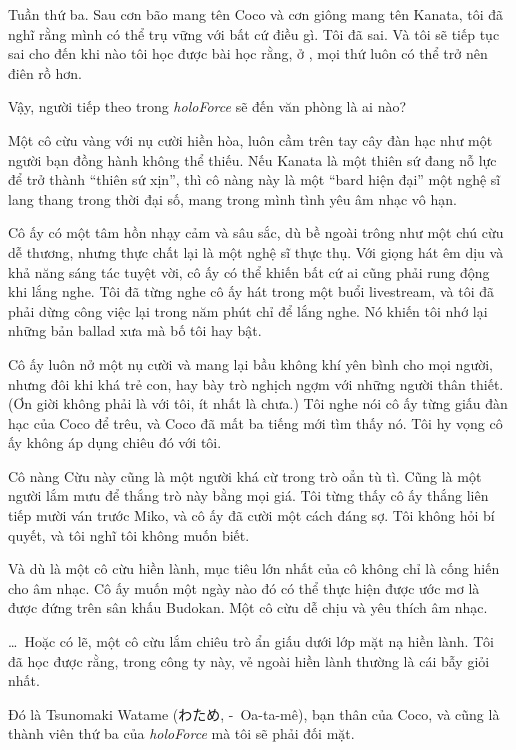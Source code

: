 \documentclass[../main.tex]{subfiles}
\begin{document}

Tuần thứ ba. Sau cơn bão mang tên Coco và cơn giông mang tên Kanata, tôi đã nghĩ rằng mình có thể trụ vững với bất cứ điều gì. Tôi đã sai. Và tôi sẽ tiếp tục sai cho đến khi nào tôi học được bài học rằng, ở \hll, mọi thứ luôn có thể trở nên điên rồ hơn.

Vậy, người tiếp theo trong \textit{holoForce} sẽ đến văn phòng là ai nào?

Một cô cừu vàng với nụ cười hiền hòa, luôn cầm trên tay cây đàn hạc như một người bạn đồng hành không thể thiếu. Nếu Kanata là một thiên sứ đang nỗ lực để trở thành ``thiên sứ xịn'', thì cô nàng này là một ``bard hiện đại'' một nghệ sĩ lang thang trong thời đại số, mang trong mình tình yêu âm nhạc vô hạn.

Cô ấy có một tâm hồn nhạy cảm và sâu sắc, dù bề ngoài trông như một chú cừu dễ thương, nhưng thực chất lại là một nghệ sĩ thực thụ. Với giọng hát êm dịu và khả năng sáng tác tuyệt vời, cô ấy có thể khiến bất cứ ai cũng phải rung động khi lắng nghe. Tôi đã từng nghe cô ấy hát trong một buổi livestream, và tôi đã phải dừng công việc lại trong năm phút chỉ để lắng nghe. Nó khiến tôi nhớ lại những bản ballad xưa mà bố tôi hay bật.

Cô ấy luôn nở một nụ cười và mang lại bầu không khí yên bình cho mọi người, nhưng đôi khi khá trẻ con, hay bày trò nghịch ngợm với những người thân thiết. (Ơn giời không phải là với tôi, ít nhất là chưa.) Tôi nghe nói cô ấy từng giấu đàn hạc của Coco để trêu, và Coco đã mất ba tiếng mới tìm thấy nó. Tôi hy vọng cô ấy không áp dụng chiêu đó với tôi.

Cô nàng Cừu này cũng là một người khá cừ trong trò oẳn tù tì. Cũng là một người lắm mưu để thắng trò này bằng mọi giá. Tôi từng thấy cô ấy thắng liên tiếp mười ván trước Miko, và cô ấy đã cười một cách đáng sợ. Tôi không hỏi bí quyết, và tôi nghĩ tôi không muốn biết.

Và dù là một cô cừu hiền lành, mục tiêu lớn nhất của cô không chỉ là cống hiến cho âm nhạc. Cô ấy muốn một ngày nào đó có thể thực hiện được ước mơ là được đứng trên sân khấu Budokan. Một cô cừu dễ chịu và yêu thích âm nhạc.

\dots\ Hoặc có lẽ, một cô cừu lắm chiêu trò ẩn giấu dưới lớp mặt nạ hiền lành. Tôi đã học được rằng, trong công ty này, vẻ ngoài hiền lành thường là cái bẫy giỏi nhất.

\chrint

Đó là Tsunomaki Watame (わため, -\ Oa-ta-mê), bạn thân của Coco, và cũng là thành viên thứ ba của \textit{holoForce} mà tôi sẽ phải đối mặt.
\end{document}
